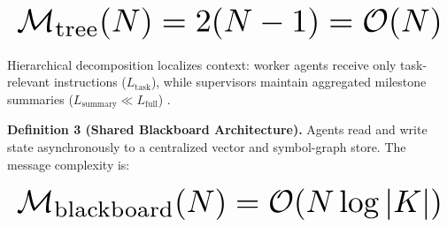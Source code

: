 \documentclass[10pt,journal,compsoc,twocolumn]{IEEEtran}
\begin{document}
\begin{equation}
\resizebox{\columnwidth}{!}{$\displaystyle
\begin{aligned}
\mathcal{M}_{\text{tree}}(N) = 2(N - 1) = \mathcal{O}(N)
\end{aligned}
$}
\end{equation}


























Hierarchical decomposition localizes context: worker agents receive only task-relevant instructions ($L_{\text{task}}$), while supervisors maintain aggregated milestone summaries ($L_{\text{summary}} \ll L_{\text{full}}$) \cite{arxiv_2406_00584}.

\textbf{Definition 3 (Shared Blackboard Architecture).} Agents read and write state asynchronously to a centralized vector and symbol-graph store. The message complexity is:


























\begin{equation}
\resizebox{\columnwidth}{!}{$\displaystyle
\begin{aligned}
\mathcal{M}_{\text{blackboard}}(N) = \mathcal{O}(N \log |K|)
\end{aligned}
$}
\end{equation}
\end{document}
